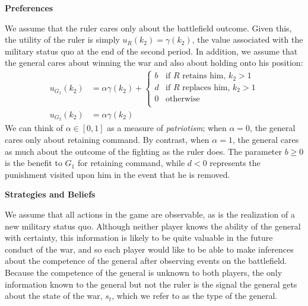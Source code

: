 \documentclass[11pt,]{article}
\begin{document}
\begin{center}
\textbf{\Large{Preferences}}\normalsize\\
\end{center}
We assume that the ruler cares only about the battlefield outcome.  Given this, the utility of the ruler is simply $u_R(k_2)=\gamma(k_2)$, the value associated with the military status quo at the end of the second period.  In addition, we assume that the general cares about winning the war and also about holding onto his position:
\begin{align*}
u_{G_1}(k_2)&=\alpha\gamma(k_2)+\left\{\begin{array}{ll}
b&\mbox{if }R\mbox{ retains him, }k_2>1\\
d&\mbox{if }R\mbox{ replaces him, }k_2>1\\
0&\mbox{otherwise}\\
\end{array}\right.\\
u_{G_2}(k_2)&=\alpha\gamma(k_2)
\end{align*}
\noindent We can think of $\alpha\in[0,1]$ as a measure of \textit{patriotism}; when $\alpha=0$, the general cares only about retaining command.  By contrast, when $\alpha=1$, the general cares as much about the outcome of the fighting as the ruler does.  The parameter $b\geq 0$ is the benefit to $G_1$ for retaining command, while $d<0$ represents the punishment visited upon him in the event that he is removed.  


\begin{center}
\textbf{\Large{Strategies and Beliefs}}\normalsize\\
\end{center}
\noindent  We assume that all actions in the game are observable, as is the realization of a new military status quo.  Although neither player knows the ability of the general with certainty, this information is likely to be quite valuable in the future conduct of the war, and so each player would like to be able to make inferences about the competence of the general after observing events on the battlefield.  Because the competence of the general is unknown to both players, the only information known to the general but not the ruler is the signal the general gets about the state of the war, $s_t$, which we refer to as the type of the general.  
\end{document}
